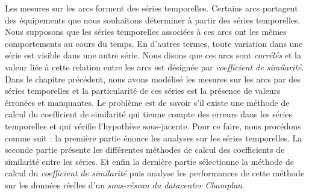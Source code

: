 Les mesures sur les arcs forment des s\'eries temporelles.
Certains arcs partagent des \'equipements que nous souhaitons d\'eterminer \`a partir des s\'eries temporelles. Nous supposons que les  s\'eries temporelles associ\'ees \`a ces arcs ont les m\^emes comportements au cours du temps. En d'autres termes, toute variation dans une s\'erie est visible dans une autre s\'erie. Nous disons que ces arcs sont {\em corr\'el\'es} et la valeur li\'ee \`a cette relation entre les arcs est d\'esign\'ee par {\em coefficient de similarit\'e}.  
\newline
Dans le chapitre pr\'ec\'edent, 
nous avons mod\'elis\'e les mesures sur les arcs par des s\'eries temporelles et la particularit\'e de ces s\'eries  est la pr\'esence de valeurs \'erron\'ees et manquantes. 
\newline
Le probl\`eme est de savoir s'il existe une m\'ethode de calcul du coefficient de similarit\'e qui tienne compte des erreurs dans les s\'eries temporelles et qui v\'erifie l'hypoth\`ese sous-jacente.
\newline
Pour ce faire, nous proc\'edons comme suit : la premi\`ere partie \'enonce  les analyses sur les s\'eries temporelles. La seconde partie pr\'esente les diff\'erentes m\'ethodes de calcul des coefficients de similarit\'e entre les s\'eries. Et enfin la derni\`ere partie s\'electionne la m\'ethode de calcul du {\em coefficient de similarit\'e} puis analyse les performances de cette m\'ethode sur les donn\'ees r\'eelles d'un {\em sous-r\'eseau du datacenter Champlan}.  